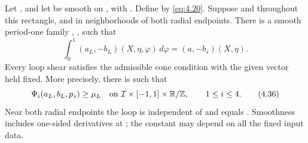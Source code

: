 \begin{lemma}\label{lem:4.11}
Let , and let
 be smooth on
, with
. Define  by
\eqref{eq:4.20}. Suppose  and
 throughout this rectangle, and
 in neighborhoods of both radial endpoints. There is a smooth
period-one family ,
, such that
\[
\int_0^1(a_L,-b_L)(X,\eta,\varphi)\,d\varphi=(a,-b_s)(X,\eta).
\]
Every loop shear satisfies the admissible cone condition with the given vector
 held fixed. More precisely, there is
 such that
\begin{equation}
\Psi_i(a_L,b_L,p_s)\ge\mu_L
\quad\hbox{on }\mathcal I\times[-1,1]\times\mathbb R/\mathbb Z,
\qquad 1\le i\le4.
\tag{4.36}\label{eq:4.36}
\end{equation}
Near both radial endpoints the loop is independent of
 and equals
. Smoothness includes one-sided derivatives at
; the constant
 may depend on all the fixed input data.
\end{lemma}


